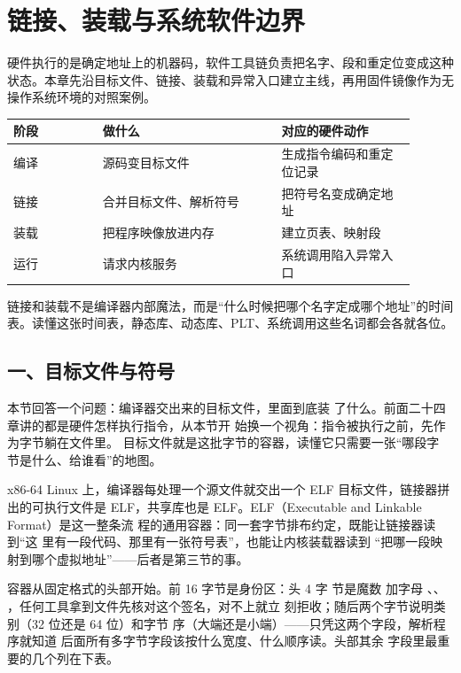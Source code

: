 \chapter{链接、装载与系统软件边界}

\begin{keyidea}
硬件执行的是确定地址上的机器码，软件工具链负责把名字、段和重定位变成这种状态。本章先沿目标文件、链接、装载和异常入口建立主线，再用固件镜像作为无操作系统环境的对照案例。
\end{keyidea}

\begin{longtable}{L{0.2\linewidth}L{0.4\linewidth}L{0.3\linewidth}}
\toprule
阶段 & 做什么 & 对应的硬件动作 \\
\midrule
编译 & 源码变目标文件 & 生成指令编码和重定位记录 \\\tablerowrule
链接 & 合并目标文件、解析符号 & 把符号名变成确定地址 \\\tablerowrule
装载 & 把程序映像放进内存 & 建立页表、映射段 \\\tablerowrule
运行 & 请求内核服务 & 系统调用陷入异常入口 \\
\bottomrule
\end{longtable}

\begin{keyidea}
链接和装载不是编译器内部魔法，而是“什么时候把哪个名字定成哪个地址”的时间表。读懂这张时间表，静态库、动态库、PLT、系统调用这些名词都会各就各位。
\end{keyidea}

\section{一、目标文件与符号}

本节回答一个问题：编译器交出来的目标文件，里面到底装
了什么。前面二十四章讲的都是硬件怎样执行指令，从本节开
始换一个视角：指令被执行之前，先作为字节躺在文件里。
目标文件就是这批字节的容器，读懂它只需要一张“哪段字
节是什么、给谁看”的地图。

x86-64 Linux 上，编译器每处理一个源文件就交出一个 ELF
目标文件，链接器拼出的可执行文件是 ELF，共享库也是
ELF。ELF（Executable and Linkable Format）是这一整条流
程的通用容器：同一套字节排布约定，既能让链接器读到“这
里有一段代码、那里有一张符号表”，也能让内核装载器读到
“把哪一段映射到哪个虚拟地址”——后者是第三节的事。

容器从固定格式的头部开始。前 16 字节是身份区：头 4 字
节是魔数  加字母 、、
，任何工具拿到文件先核对这个签名，对不上就立
刻拒收；随后两个字节说明类别（32 位还是 64 位）和字节
序（大端还是小端）——只凭这两个字段，解析程序就知道
后面所有多字节字段该按什么宽度、什么顺序读。头部其余
字段里最重要的几个列在下表。

